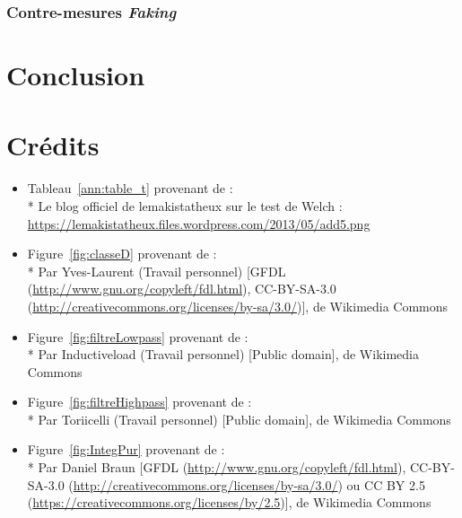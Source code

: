 \documentclass[10pt, oneside, a4paper]{article}
\begin{document}
\subsubsection{Contre-mesures \textit{Faking}}


\newpage
\section{Conclusion}


\newpage
\pagebreak
{}
\section*{Crédits}

\begin{itemize}
\item Tableau~\ref{ann:table_t} provenant de :\\*
Le blog officiel de lemakistatheux sur le test de Welch :
\url{https://lemakistatheux.files.wordpress.com/2013/05/add5.png}

\item Figure~\ref{fig:classeD} provenant de :\\*
Par Yves-Laurent (Travail personnel) [GFDL (\url{http://www.gnu.org/copyleft/fdl.html}),
CC-BY-SA-3.0 (\url{http://creativecommons.org/licenses/by-sa/3.0/})], de Wikimedia Commons

\item Figure~\ref{fig:filtreLowpass} provenant de :\\*
Par Inductiveload (Travail personnel) [Public domain], de Wikimedia Commons

\item Figure~\ref{fig:filtreHighpass} provenant de :\\*
Par Toriicelli (Travail personnel) [Public domain], de Wikimedia Commons

\item Figure~\ref{fig:IntegPur} provenant de :\\*
Par Daniel Braun [GFDL (\url{http://www.gnu.org/copyleft/fdl.html}),
CC-BY-SA-3.0 (\url{http://creativecommons.org/licenses/by-sa/3.0/}) ou
CC BY 2.5 (\url{https://creativecommons.org/licenses/by/2.5})], de Wikimedia Commons
\end{itemize}

\end{document}
